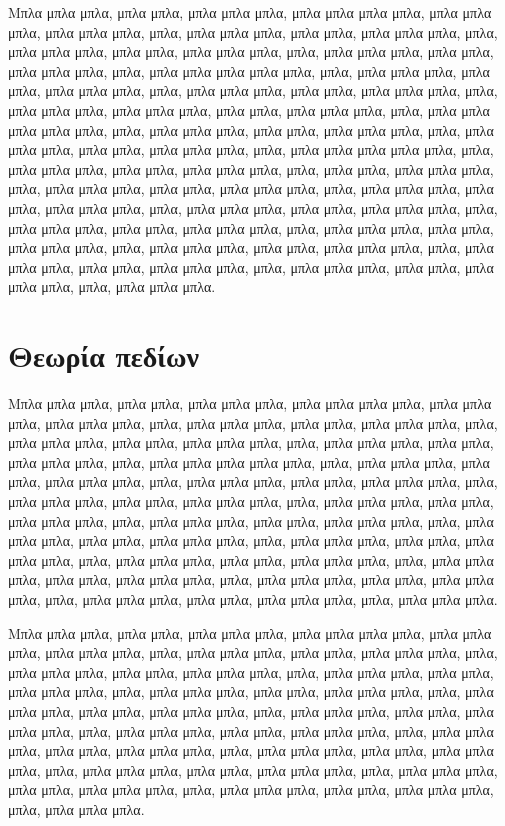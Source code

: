 Μπλα μπλα μπλα, μπλα μπλα, μπλα μπλα μπλα, μπλα μπλα μπλα μπλα,
μπλα μπλα μπλα, μπλα μπλα μπλα, μπλα, μπλα μπλα μπλα, μπλα μπλα,
μπλα μπλα μπλα, μπλα, μπλα μπλα μπλα, μπλα μπλα, μπλα μπλα μπλα,
μπλα, μπλα μπλα μπλα, μπλα μπλα, μπλα μπλα μπλα, μπλα, μπλα μπλα
μπλα μπλα μπλα, μπλα, μπλα μπλα μπλα, μπλα μπλα, μπλα μπλα μπλα,
μπλα, μπλα μπλα μπλα, μπλα μπλα, μπλα μπλα μπλα, μπλα, μπλα μπλα
μπλα, μπλα μπλα μπλα, μπλα μπλα, μπλα μπλα μπλα, μπλα, μπλα μπλα
μπλα μπλα μπλα, μπλα, μπλα μπλα μπλα, μπλα μπλα, μπλα μπλα μπλα,
μπλα, μπλα μπλα μπλα, μπλα μπλα, μπλα μπλα μπλα, μπλα, μπλα μπλα
μπλα μπλα μπλα, μπλα, μπλα μπλα μπλα, μπλα μπλα, μπλα μπλα μπλα,
μπλα, μπλα μπλα, μπλα μπλα μπλα, μπλα, μπλα μπλα μπλα, μπλα μπλα,
μπλα μπλα μπλα, μπλα, μπλα μπλα μπλα, μπλα μπλα, μπλα μπλα μπλα,
μπλα, μπλα μπλα μπλα, μπλα μπλα, μπλα μπλα μπλα, μπλα, μπλα μπλα
μπλα, μπλα μπλα, μπλα μπλα μπλα, μπλα, μπλα μπλα μπλα, μπλα μπλα,
μπλα μπλα μπλα, μπλα, μπλα μπλα μπλα, μπλα μπλα, μπλα μπλα μπλα,
μπλα, μπλα μπλα μπλα, μπλα μπλα, μπλα μπλα μπλα, μπλα, μπλα μπλα
μπλα, μπλα μπλα, μπλα μπλα μπλα, μπλα, μπλα μπλα μπλα.


\section{Θεωρία πεδίων}

Μπλα μπλα μπλα, μπλα μπλα, μπλα μπλα μπλα, μπλα μπλα μπλα μπλα,
μπλα μπλα μπλα, μπλα μπλα μπλα, μπλα, μπλα μπλα μπλα, μπλα μπλα,
μπλα μπλα μπλα, μπλα, μπλα μπλα μπλα, μπλα μπλα, μπλα μπλα μπλα,
μπλα, μπλα μπλα μπλα, μπλα μπλα, μπλα μπλα μπλα, μπλα, μπλα μπλα
μπλα μπλα μπλα, μπλα, μπλα μπλα μπλα, μπλα μπλα, μπλα μπλα μπλα,
μπλα, μπλα μπλα μπλα, μπλα μπλα, μπλα μπλα μπλα, μπλα, μπλα μπλα
μπλα, μπλα μπλα, μπλα μπλα μπλα, μπλα, μπλα μπλα μπλα, μπλα μπλα,
μπλα μπλα μπλα, μπλα, μπλα μπλα μπλα, μπλα μπλα, μπλα μπλα μπλα,
μπλα, μπλα μπλα μπλα, μπλα μπλα, μπλα μπλα μπλα, μπλα, μπλα μπλα
μπλα, μπλα μπλα, μπλα μπλα μπλα, μπλα, μπλα μπλα μπλα, μπλα μπλα,
μπλα μπλα μπλα, μπλα, μπλα μπλα μπλα, μπλα μπλα, μπλα μπλα μπλα,
μπλα, μπλα μπλα μπλα, μπλα μπλα, μπλα μπλα μπλα, μπλα, μπλα μπλα
μπλα, μπλα μπλα, μπλα μπλα μπλα, μπλα, μπλα μπλα μπλα.

Μπλα μπλα μπλα, μπλα μπλα, μπλα μπλα μπλα, μπλα μπλα μπλα μπλα,
μπλα μπλα μπλα, μπλα μπλα μπλα, μπλα, μπλα μπλα μπλα, μπλα μπλα,
μπλα μπλα μπλα, μπλα, μπλα μπλα μπλα, μπλα μπλα, μπλα μπλα μπλα,
μπλα, μπλα μπλα μπλα, μπλα μπλα, μπλα μπλα μπλα, μπλα, μπλα μπλα
μπλα, μπλα μπλα, μπλα μπλα μπλα, μπλα, μπλα μπλα μπλα, μπλα μπλα,
μπλα μπλα μπλα, μπλα, μπλα μπλα μπλα, μπλα μπλα, μπλα μπλα μπλα,
μπλα, μπλα μπλα μπλα, μπλα μπλα, μπλα μπλα μπλα, μπλα, μπλα μπλα
μπλα, μπλα μπλα, μπλα μπλα μπλα, μπλα, μπλα μπλα μπλα, μπλα μπλα,
μπλα μπλα μπλα, μπλα, μπλα μπλα μπλα, μπλα μπλα, μπλα μπλα μπλα,
μπλα, μπλα μπλα μπλα, μπλα μπλα, μπλα μπλα μπλα, μπλα, μπλα μπλα
μπλα, μπλα μπλα, μπλα μπλα μπλα, μπλα, μπλα μπλα μπλα.

